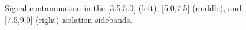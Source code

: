 \begin{figure}[htbp]
  \centering
  \caption{
    Signal contamination in the [3.5,5.0] (left), [5.0,7.5] (middle), and [7.5,9.0] (right) isolation sidebands.
  }
  \label{fig:impurity-signal-contamination}
\end{figure}

